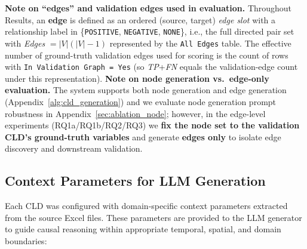 \textbf{Note on ``edges'' and validation edges used in evaluation.} Throughout Results, an \textbf{edge} is defined as an ordered (source, target) \textit{edge slot} with a relationship label in \{\texttt{POSITIVE}, \texttt{NEGATIVE}, \texttt{NONE}\}, i.e., the full directed pair set with \textit{Edges} $=|V|(|V|-1)$ represented by the \texttt{All Edges} table. The effective number of ground-truth validation edges used for scoring is the count of rows with \texttt{In Validation Graph = Yes} (so \textit{TP}+\textit{FN} equals the validation-edge count under this representation).
\textbf{Note on node generation vs.\ edge-only evaluation.} The system supports both node generation and edge generation (Appendix~\ref{alg:cld_generation}) and we evaluate node generation prompt robustness in Appendix~\ref{sec:ablation_node}; however, in the edge-level experiments (RQ1a/RQ1b/RQ2/RQ3) we \textbf{fix the node set to the validation CLD's ground-truth variables} and generate \textbf{edges only} to isolate edge discovery and downstream validation.

\subsection{Context Parameters for LLM Generation}

Each CLD was configured with domain-specific context parameters extracted from the source Excel files. These parameters are provided to the LLM generator to guide causal reasoning within appropriate temporal, spatial, and domain boundaries:

